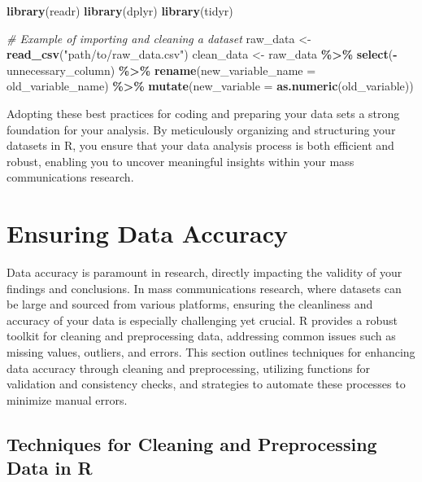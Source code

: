 \documentclass[
]{book}
\newenvironment{Shaded}{\begin{snugshade}}{\end{snugshade}}
\newcommand{\AttributeTok}[1]{\textcolor[rgb]{0.13,0.29,0.53}{#1}}
\newcommand{\CommentTok}[1]{\textcolor[rgb]{0.56,0.35,0.01}{\textit{#1}}}
\newcommand{\FunctionTok}[1]{\textcolor[rgb]{0.13,0.29,0.53}{\textbf{#1}}}
\newcommand{\NormalTok}[1]{#1}
\newcommand{\OtherTok}[1]{\textcolor[rgb]{0.56,0.35,0.01}{#1}}
\newcommand{\SpecialCharTok}[1]{\textcolor[rgb]{0.81,0.36,0.00}{\textbf{#1}}}
\newcommand{\StringTok}[1]{\textcolor[rgb]{0.31,0.60,0.02}{#1}}
\begin{document}
\begin{Shaded}
\begin{Highlighting}[]
\FunctionTok{library}\NormalTok{(readr)}
\FunctionTok{library}\NormalTok{(dplyr)}
\FunctionTok{library}\NormalTok{(tidyr)}

\CommentTok{\# Example of importing and cleaning a dataset}
\NormalTok{raw\_data }\OtherTok{\textless{}{-}} \FunctionTok{read\_csv}\NormalTok{(}\StringTok{"path/to/raw\_data.csv"}\NormalTok{)}
\NormalTok{clean\_data }\OtherTok{\textless{}{-}}\NormalTok{ raw\_data }\SpecialCharTok{\%\textgreater{}\%}
  \FunctionTok{select}\NormalTok{(}\SpecialCharTok{{-}}\NormalTok{unnecessary\_column) }\SpecialCharTok{\%\textgreater{}\%}
  \FunctionTok{rename}\NormalTok{(}\AttributeTok{new\_variable\_name =}\NormalTok{ old\_variable\_name) }\SpecialCharTok{\%\textgreater{}\%}
  \FunctionTok{mutate}\NormalTok{(}\AttributeTok{new\_variable =} \FunctionTok{as.numeric}\NormalTok{(old\_variable))}
\end{Highlighting}
\end{Shaded}

Adopting these best practices for coding and preparing your data sets a strong foundation for your analysis. By meticulously organizing and structuring your datasets in R, you ensure that your data analysis process is both efficient and robust, enabling you to uncover meaningful insights within your mass communications research.

\hypertarget{ensuring-data-accuracy}{%
\section{Ensuring Data Accuracy}\label{ensuring-data-accuracy}}

Data accuracy is paramount in research, directly impacting the validity of your findings and conclusions. In mass communications research, where datasets can be large and sourced from various platforms, ensuring the cleanliness and accuracy of your data is especially challenging yet crucial. R provides a robust toolkit for cleaning and preprocessing data, addressing common issues such as missing values, outliers, and errors. This section outlines techniques for enhancing data accuracy through cleaning and preprocessing, utilizing functions for validation and consistency checks, and strategies to automate these processes to minimize manual errors.

\hypertarget{techniques-for-cleaning-and-preprocessing-data-in-r}{%
\subsection*{Techniques for Cleaning and Preprocessing Data in R}\label{techniques-for-cleaning-and-preprocessing-data-in-r}}
\end{document}

